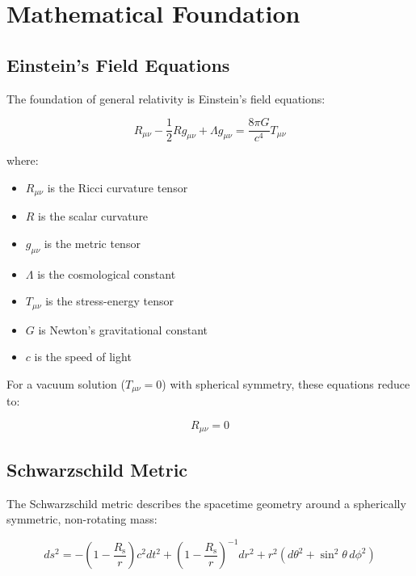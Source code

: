 \documentclass[12pt,a4paper]{article}
\theoremstyle{definition}
\theoremstyle{remark}
\newcommand{\Rs}{R_{\text{s}}}
\begin{document}
\section{Mathematical Foundation}

\subsection{Einstein's Field Equations}

The foundation of general relativity is Einstein's field equations:

\begin{equation}
    R_{\mu\nu} - \frac{1}{2}Rg_{\mu\nu} + \Lambda g_{\mu\nu} = \frac{8\pi G}{c^4}T_{\mu\nu}
\end{equation}

where:
\begin{itemize}
    \item $R_{\mu\nu}$ is the Ricci curvature tensor
    \item $R$ is the scalar curvature
    \item $g_{\mu\nu}$ is the metric tensor
    \item $\Lambda$ is the cosmological constant
    \item $T_{\mu\nu}$ is the stress-energy tensor
    \item $G$ is Newton's gravitational constant
    \item $c$ is the speed of light
\end{itemize}

For a vacuum solution ($T_{\mu\nu} = 0$) with spherical symmetry, these equations reduce to:

\begin{equation}
    R_{\mu\nu} = 0
\end{equation}

\subsection{Schwarzschild Metric}

The Schwarzschild metric describes the spacetime geometry around a spherically symmetric, non-rotating mass:

\begin{equation}
    ds^2 = -\left(1 - \frac{\Rs}{r}\right)c^2dt^2 + \left(1 - \frac{\Rs}{r}\right)^{-1}dr^2 + r^2(d\theta^2 + \sin^2\theta \, d\phi^2)
    \label{eq:schwarzschild_metric}
\end{equation}
\end{document}
